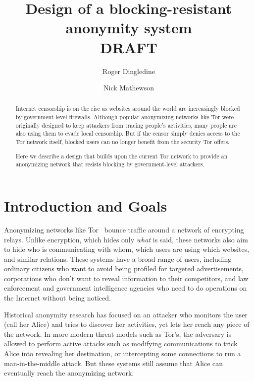\documentclass{llncs}
\begin{document}
\title{Design of a blocking-resistant anonymity system\\DRAFT}

\author{Roger Dingledine \and Nick Mathewson}

\maketitle
\pagestyle{plain}

\begin{abstract}

Internet censorship is on the rise as websites around the world are
increasingly blocked by government-level firewalls.  Although popular
anonymizing networks like Tor were originally designed to keep attackers from
tracing people's activities, many people are also using them to evade local
censorship.  But if the censor simply denies access to the Tor network
itself, blocked users can no longer benefit from the security Tor offers.

Here we describe a design that builds upon the current Tor network
to provide an anonymizing network that resists blocking
by government-level attackers.

\end{abstract}

\section{Introduction and Goals}

Anonymizing networks like Tor~\cite{tor-design} bounce traffic around a
network of encrypting relays.  Unlike encryption, which hides only {\it what}
is said, these networks also aim to hide who is communicating with whom, which
users are using which websites, and similar relations.  These systems have a
broad range of users, including ordinary citizens who want to avoid being
profiled for targeted advertisements, corporations who don't want to reveal
information to their competitors, and law enforcement and government
intelligence agencies who need to do operations on the Internet without being
noticed.

Historical anonymity research has focused on an
attacker who monitors the user (call her Alice) and tries to discover her
activities, yet lets her reach any piece of the network. In more modern
threat models such as Tor's, the adversary is allowed to perform active
attacks such as modifying communications to trick Alice
into revealing her destination, or intercepting some connections
to run a man-in-the-middle attack. But these systems still assume that
Alice can eventually reach the anonymizing network.
\end{document}
